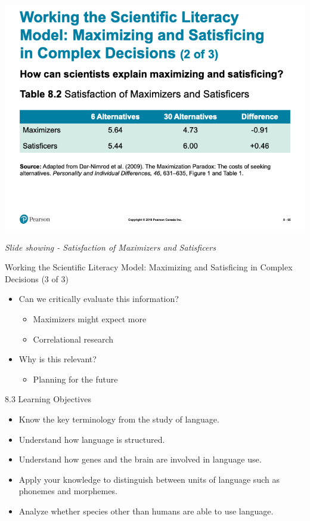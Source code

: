 \documentclass[
]{book}
\providecommand{\tightlist}{%
  \setlength{\itemsep}{0pt}\setlength{\parskip}{0pt}}
\begin{document}
\includegraphics{assets/unit_1/slide_66.png}

\emph{Slide showing - Satisfaction of Maximizers and Satisficers}

Working the Scientific Literacy Model: Maximizing and Satisficing in Complex Decisions (3 of 3)

\begin{itemize}
\tightlist
\item
  Can we critically evaluate this information?

  \begin{itemize}
  \tightlist
  \item
    Maximizers might expect more\\
  \item
    Correlational research
  \end{itemize}
\item
  Why is this relevant?

  \begin{itemize}
  \tightlist
  \item
    Planning for the future
  \end{itemize}
\end{itemize}

8.3 Learning Objectives

\begin{itemize}
\tightlist
\item
  Know the key terminology from the study of language.\\
\item
  Understand how language is structured.\\
\item
  Understand how genes and the brain are involved in language use.\\
\item
  Apply your knowledge to distinguish between units of language such as phonemes and morphemes.\\
\item
  Analyze whether species other than humans are able to use language.
\end{itemize}
\end{document}
